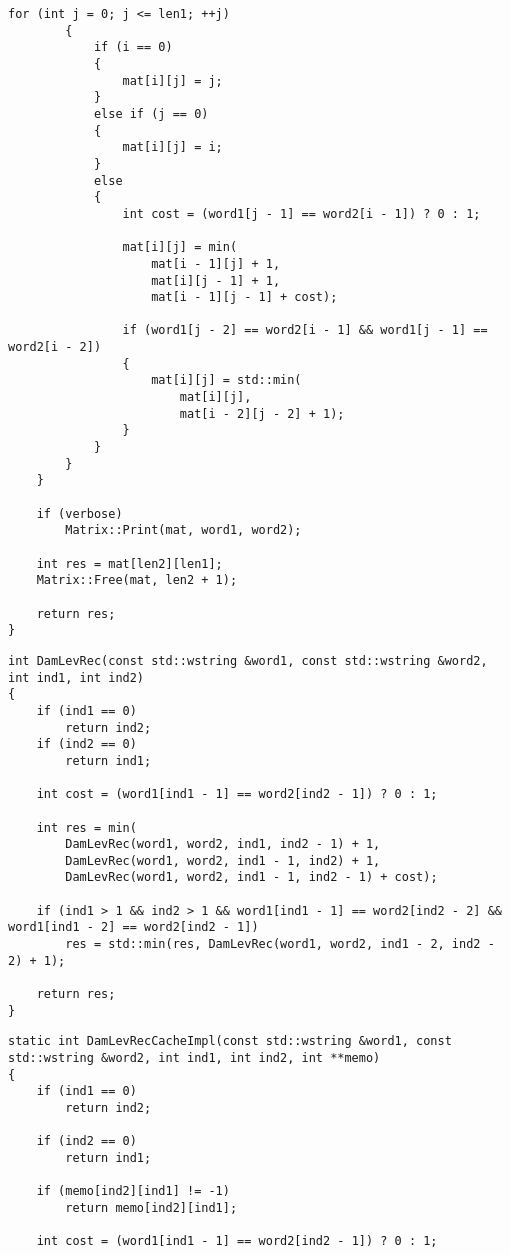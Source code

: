 \begin{lstlisting}[caption=Матричный алгоритм поиска расстояния Дамерау~---~Левенштейна (часть 2)]
        for (int j = 0; j <= len1; ++j)
        {
            if (i == 0)
            {
                mat[i][j] = j;
            }
            else if (j == 0)
            {
                mat[i][j] = i;
            }
            else
            {
                int cost = (word1[j - 1] == word2[i - 1]) ? 0 : 1;

                mat[i][j] = min(
                    mat[i - 1][j] + 1,
                    mat[i][j - 1] + 1,
                    mat[i - 1][j - 1] + cost);

                if (word1[j - 2] == word2[i - 1] && word1[j - 1] == word2[i - 2])
                {
                    mat[i][j] = std::min(
                        mat[i][j],
                        mat[i - 2][j - 2] + 1);
                }
            }
        }
    }

    if (verbose)
        Matrix::Print(mat, word1, word2);

    int res = mat[len2][len1];
    Matrix::Free(mat, len2 + 1);

    return res;
}
\end{lstlisting}

\begin{lstlisting}[caption=Рекурсивный алгоритм поиска расстояния Дамерау~---~Левенштейна]
int DamLevRec(const std::wstring &word1, const std::wstring &word2, int ind1, int ind2)
{
    if (ind1 == 0)
        return ind2;
    if (ind2 == 0)
        return ind1;

    int cost = (word1[ind1 - 1] == word2[ind2 - 1]) ? 0 : 1;

    int res = min(
        DamLevRec(word1, word2, ind1, ind2 - 1) + 1,
        DamLevRec(word1, word2, ind1 - 1, ind2) + 1,
        DamLevRec(word1, word2, ind1 - 1, ind2 - 1) + cost);

    if (ind1 > 1 && ind2 > 1 && word1[ind1 - 1] == word2[ind2 - 2] && word1[ind1 - 2] == word2[ind2 - 1])
        res = std::min(res, DamLevRec(word1, word2, ind1 - 2, ind2 - 2) + 1);

    return res;
}
\end{lstlisting}

\begin{lstlisting}[caption=Рекурсивный алгоритм поиска расстояния Дамерау~---~Левенштейна с кэшированием (реализация) (часть 1)]
static int DamLevRecCacheImpl(const std::wstring &word1, const std::wstring &word2, int ind1, int ind2, int **memo)
{
    if (ind1 == 0)
        return ind2;

    if (ind2 == 0)
        return ind1;

    if (memo[ind2][ind1] != -1)
        return memo[ind2][ind1];
    
    int cost = (word1[ind1 - 1] == word2[ind2 - 1]) ? 0 : 1;
\end{lstlisting}

